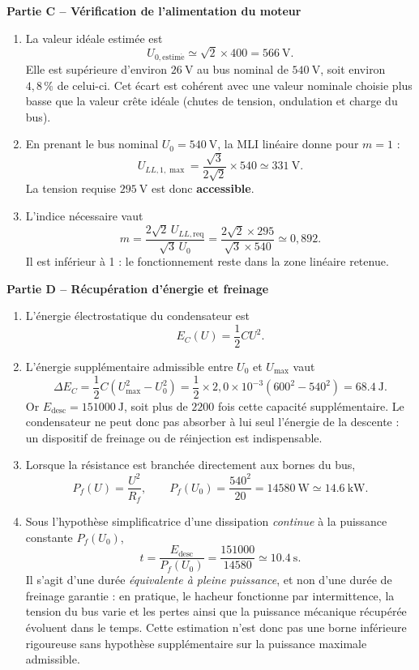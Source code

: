 \documentclass[11pt,a4paper]{article}
\newcommand{\partie}[1]{\vspace{0.7em}\noindent\textbf{\large #1}\par\vspace{0.25em}}
\begin{document}
\partie{Partie C -- Vérification de l'alimentation du moteur}
\begin{enumerate}[label=\textbf{C\arabic*.}]
\item La valeur idéale estimée est
\[
U_{0,\mathrm{estim\acute e}}\simeq\sqrt{2}\times400
=\boxed{\SI{566}{\volt}}.
\]
Elle est supérieure d'environ $\SI{26}{\volt}$ au bus nominal de $\SI{540}{\volt}$, soit environ $4{,}8\,\%$ de celui-ci. Cet écart est cohérent avec une valeur nominale choisie plus basse que la valeur crête idéale (chutes de tension, ondulation et charge du bus).
\item En prenant le bus nominal $U_0=\SI{540}{\volt}$, la MLI linéaire donne pour $m=1$ :
\[
U_{LL,1,\max}=\frac{\sqrt3}{2\sqrt2}\times540
\simeq\boxed{\SI{331}{\volt}}.
\]
La tension requise $\SI{295}{\volt}$ est donc \textbf{accessible}.
\item L'indice nécessaire vaut
\[
\boxed{m=\frac{2\sqrt2\,U_{LL,\mathrm{req}}}{\sqrt3\,U_0}}
=\frac{2\sqrt2\times295}{\sqrt3\times540}
\simeq\boxed{0{,}892}.
\]
Il est inférieur à 1 : le fonctionnement reste dans la zone linéaire retenue.
\end{enumerate}

\partie{Partie D -- Récupération d'énergie et freinage}
\begin{enumerate}[label=\textbf{D\arabic*.}]
\item L'énergie électrostatique du condensateur est
\[
\boxed{E_C(U)=\frac12 CU^2}.
\]
\item L'énergie supplémentaire admissible entre $U_0$ et $U_{\max}$ vaut
\[
\Delta E_C=\frac12 C(U_{\max}^2-U_0^2)
=\frac12\times 2{,}0\times10^{-3}(600^2-540^2)
=\boxed{\SI{68.4}{\joule}}.
\]
Or $E_{\mathrm{desc}}=\SI{151000}{\joule}$, soit plus de $2200$ fois cette capacité supplémentaire. Le condensateur ne peut donc pas absorber à lui seul l'énergie de la descente : un dispositif de freinage ou de réinjection est indispensable.
\item Lorsque la résistance est branchée directement aux bornes du bus,
\[
\boxed{P_f(U)=\frac{U^2}{R_f}},\qquad
P_f(U_0)=\frac{540^2}{20}=\boxed{\SI{14580}{\watt}\simeq\SI{14.6}{\kilo\watt}}.
\]
\item Sous l'hypothèse simplificatrice d'une dissipation \emph{continue} à la puissance constante $P_f(U_0)$,
\[
\boxed{t=\frac{E_{\mathrm{desc}}}{P_f(U_0)}}
=\frac{151000}{14580}\simeq\boxed{\SI{10.4}{\second}}.
\]
Il s'agit d'une durée \emph{équivalente à pleine puissance}, et non d'une durée de freinage garantie : en pratique, le hacheur fonctionne par intermittence, la tension du bus varie et les pertes ainsi que la puissance mécanique récupérée évoluent dans le temps. Cette estimation n'est donc pas une borne inférieure rigoureuse sans hypothèse supplémentaire sur la puissance maximale admissible.
\end{enumerate}
\end{document}
